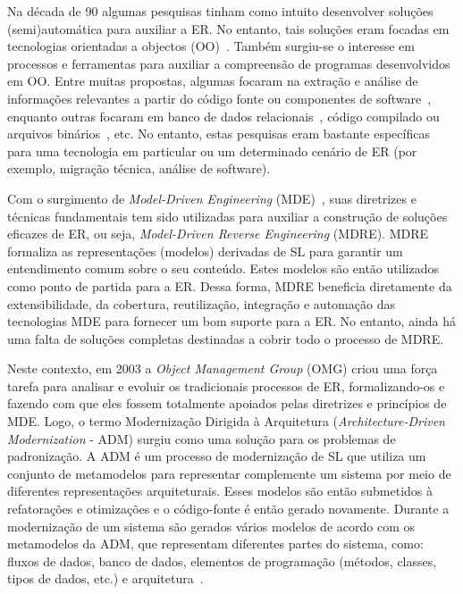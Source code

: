 Na década de 90 algumas pesquisas tinham como intuito desenvolver soluções (semi)automática para auxiliar a ER. No entanto, tais soluções eram focadas em tecnologias orientadas a objectos (OO)~\citep{Software_Reuse_and_Reverse_Engineering_in_Practice}. Também surgiu-se o interesse em processos e ferramentas para auxiliar a compreensão de programas desenvolvidos em OO. Entre muitas propostas, algumas focaram na extração e análise de informações relevantes a partir do código fonte ou componentes de software~\citep{Re2_Reverse_engineering_and_reuse_re_engineering}, enquanto outras focaram em banco de dados relacionais~\citep{An_approach_for_reverse_engineering_of_relational_databases}, código compilado ou arquivos binários~\citep{Reversing_Secrets_of_Reverse_Engineering}, etc. No entanto, estas pesquisas eram bastante específicas para uma tecnologia em particular ou um determinado cenário de ER (por exemplo, migração técnica, análise de software).

Com o surgimento de \textit{Model-Driven Engineering} (MDE)~\citep{Model_Driven_Engineering}, suas diretrizes e técnicas fundamentais tem sido utilizadas para auxiliar a construção de soluções eficazes de ER, ou seja, \textit{Model-Driven Reverse Engineering} (MDRE). MDRE formaliza as representações (modelos) derivadas de SL para garantir um entendimento comum sobre o seu conteúdo. Estes modelos são então utilizados como ponto de partida para a ER. Dessa forma, MDRE beneficia diretamente da extensibilidade, da cobertura, reutilização, integração e automação das tecnologias MDE para fornecer um bom suporte para a ER. No entanto, ainda há uma falta de soluções completas destinadas a cobrir todo o processo de MDRE.

Neste contexto, em 2003 a \textit{Object Management Group} (OMG) criou uma força tarefa para analisar e evoluir os tradicionais processos de ER, formalizando-os e fazendo com que eles fossem totalmente apoiados pelas diretrizes e princípios de MDE. Logo, o termo Modernização Dirigida à Arquitetura (\textit{Architecture-Driven Modernization} - ADM) surgiu como uma solução para os problemas de padronização. A ADM é um processo de modernização de SL que utiliza um conjunto de metamodelos para representar complemente um sistema por meio de diferentes representações arquiteturais. Esses modelos são então submetidos à refatorações e otimizações e o código-fonte é então gerado novamente. Durante a modernização de um sistema são gerados vários modelos de acordo com os metamodelos da ADM, que representam diferentes partes do sistema, como: fluxos de dados, banco de dados, elementos de programação (métodos, classes, tipos de dados, etc.) e arquitetura~\citep{Information_Systems_Transformation_Architecture_Driven_Modernization_Case_Studies, Software_modernization_by_recovering_Web_services_from_legacy_databases}.

